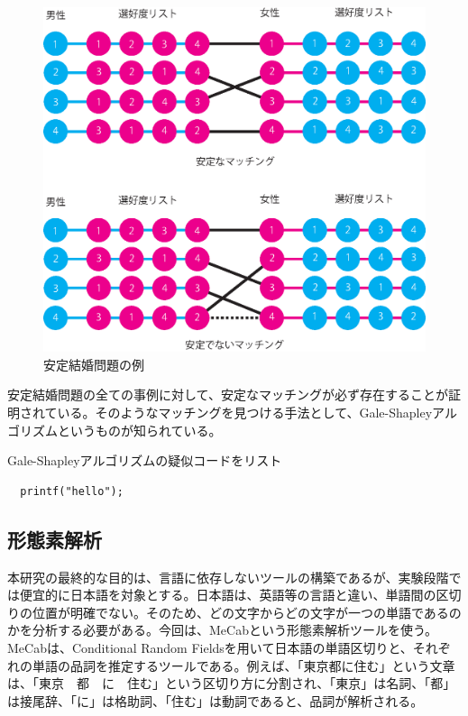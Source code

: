 \documentclass[12pt]{jarticle}
\begin{document}
\begin{figure}
  \begin{center}
    \includegraphics[scale=0.5]{image/match.eps}
  \end{center}
  \caption{安定結婚問題の例}
  \label{match}
\end{figure}

安定結婚問題の全ての事例に対して、安定なマッチングが必ず存在することが証明されている。そのようなマッチングを見つける手法として、Gale-Shapleyアルゴリズムというものが知られている。

Gale-Shapleyアルゴリズムの疑似コードをリスト

\begin{lstlisting}
  printf("hello");
\end{lstlisting}


\subsection{形態素解析}
本研究の最終的な目的は、言語に依存しないツールの構築であるが、実験段階では便宜的に日本語を対象とする。日本語は、英語等の言語と違い、単語間の区切りの位置が明確でない。そのため、どの文字からどの文字が一つの単語であるのかを分析する必要がある。今回は、MeCab\cite{MeCab}という形態素解析ツールを使う。MeCabは、Conditional Random Fieldsを用いて日本語の単語区切りと、それぞれの単語の品詞を推定するツールである。例えば、「東京都に住む」という文章は、「東京　都　に　住む」という区切り方に分割され、「東京」は名詞、「都」は接尾辞、「に」は格助詞、「住む」は動詞であると、品詞が解析される。
\end{document}
